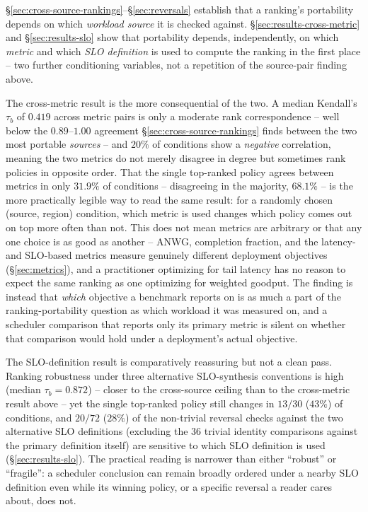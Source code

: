 \S\ref{sec:cross-source-rankings}--\S\ref{sec:reversals} establish that a
ranking's portability depends on which \emph{workload source} it is checked
against. \S\ref{sec:results-cross-metric} and \S\ref{sec:results-slo} show
that portability depends, independently, on which \emph{metric} and which
\emph{SLO definition} is used to compute the ranking in the first place --
two further conditioning variables, not a repetition of the source-pair
finding above.

The cross-metric result is the more consequential of the two. A median
Kendall's $\tau_b$ of $0.419$ across metric pairs is only a moderate rank
correspondence -- well below the $0.89$--$1.00$ agreement
\S\ref{sec:cross-source-rankings} finds between the two most portable
\emph{sources} -- and $20\%$ of conditions show a \emph{negative}
correlation, meaning the two metrics do not merely disagree in degree but
sometimes rank policies in opposite order. That the single top-ranked
policy agrees between metrics in only $31.9\%$ of conditions -- disagreeing
in the majority, $68.1\%$ -- is the more practically legible way to read
the same result: for a randomly chosen (source, region) condition, which
metric is used changes which policy comes out on top more often than not.
This does not mean
metrics are arbitrary or that any one choice is as good as another -- ANWG,
completion fraction, and the latency- and SLO-based metrics measure
genuinely different deployment objectives (\S\ref{sec:metrics}), and a
practitioner optimizing for tail latency has no reason to expect the same
ranking as one optimizing for weighted goodput. The finding is instead that
\emph{which} objective a benchmark reports on is as much a part of the
ranking-portability question as which workload it was measured on, and a
scheduler comparison that reports only its primary metric is silent on
whether that comparison would hold under a deployment's actual objective.

The SLO-definition result is comparatively reassuring but not a clean
pass. Ranking robustness under three alternative SLO-synthesis conventions
is high (median $\tau_b = 0.872$) -- closer to the cross-source ceiling
than to the cross-metric result above -- yet the single top-ranked policy
still changes in $13/30$ ($43\%$) of conditions, and $20/72$ ($28\%$) of
the non-trivial reversal checks against the two alternative SLO
definitions (excluding the 36 trivial identity comparisons against the
primary definition itself) are sensitive to which SLO definition is used
(\S\ref{sec:results-slo}). The practical reading is narrower than either
``robust'' or ``fragile'': a scheduler conclusion can remain broadly
ordered under a nearby SLO definition even while its winning policy, or a
specific reversal a reader cares about, does not.

